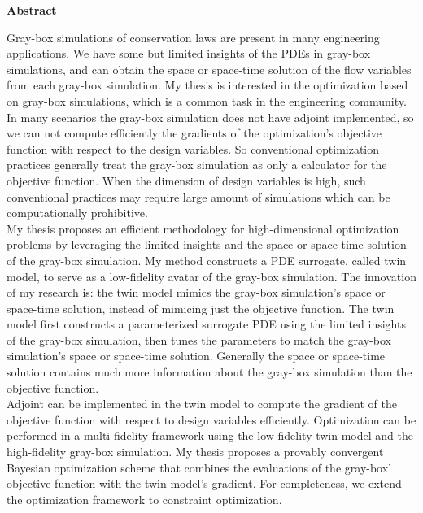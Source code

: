 \documentclass[a4paper,onecolumn]{article}
\theoremstyle{remark}
\begin{document}
\setcounter{page}{1}

$$ $$
\newpage
\hspace{.4\textwidth}
\Large\textbf{Abstract}\\
\normalsize

\noindent Gray-box simulations of conservation laws are
present in many engineering applications. 
We have some but limited
insights of the PDEs in gray-box simulations, and can obtain the space or space-time 
solution of the flow variables from each gray-box simulation.
My thesis is interested in the optimization based on gray-box simulations,
which is a common task in the engineering community.
In many scenarios the gray-box simulation does not have adjoint implemented,
so we can not compute efficiently the gradients of 
the optimization's objective function with respect to the design variables. 
So conventional optimization practices generally treat the gray-box simulation
as only a calculator for the objective function. 
When the dimension of design variables is high,
such conventional practices may require large amount of simulations which can be 
computationally prohibitive.\\

\noindent My thesis proposes an efficient methodology for
high-dimensional optimization problems by leveraging the limited insights
and the space or space-time solution of the gray-box simulation. 
My method constructs a PDE surrogate, 
called twin model, to serve as a low-fidelity avatar of the gray-box simulation. 
The innovation of my research is: the twin model mimics the gray-box simulation's space 
or space-time solution, instead of mimicing just the objective function.
The twin model first constructs a parameterized surrogate PDE using the limited insights of the 
gray-box simulation, then tunes the parameters to match the 
gray-box simulation's space or space-time solution.
Generally the space or space-time solution contains much more information 
about the gray-box simulation than the objective function.\\

\noindent Adjoint can be implemented in the twin model to 
compute the gradient of the objective function with respect to design variables efficiently.
Optimization can be performed in a multi-fidelity framework using the low-fidelity
twin model and the high-fidelity gray-box simulation.
My thesis proposes a provably convergent Bayesian optimization scheme that combines
the evaluations of the gray-box' objective function with the twin model's gradient.
For completeness, we extend the optimization framework to constraint optimization.
\\
\end{document}
